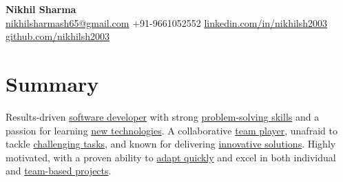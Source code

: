 \documentclass[a4paper,10pt]{article} %
\begin{document}
\begin{center}
    {\Huge \textbf{Nikhil Sharma}} \\
    \vspace{6pt} %
    \small
    \faEnvelope \href{mailto:nikhilsharmash65@gmail.com}{nikhilsharmash65@gmail.com} \hspace{1.5em} %
    \faMobile \hspace{0.3em} +91-9661052552 \hspace{1.5em} %
    \faLinkedinSquare \href{https://www.linkedin.com/in/nikhilsh2003/}{linkedin.com/in/nikhilsh2003} \hspace{1.5em} %
    \faGithub \href{https://github.com/nikhilsh2003}{github.com/nikhilsh2003} %
\end{center}

\vspace{0.01em} %

\section*{Summary}
Results-driven \underline{software developer} with strong \underline{problem-solving skills} and a passion for learning \underline{new technologies}. A collaborative \underline{team player}, unafraid to tackle \underline{challenging tasks}, and known for delivering \underline{innovative solutions}. Highly motivated, with a proven ability to \underline{adapt quickly} and excel in both individual and \underline{team-based projects}.
\vspace{0.01em} %

\end{document}
